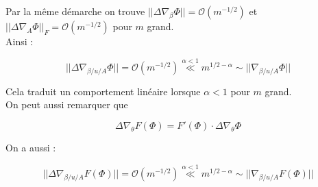 \documentclass[a4paper, 11pt, french]{article}
\begin{document}
\begin{itemize}
	Par la même démarche on trouve $||\Delta \nabla_{\beta} \Phi|| = \mathcal{O}(m^{-1/2})$ et $||\Delta \nabla_{A} \Phi||_F = \mathcal{O}(m^{-1/2})$ pour $m$ grand. \\
	
	Ainsi :
	
	\[||\Delta \nabla_{\beta / u / A} \Phi|| = \mathcal{O}(m^{-1/2}) \stackrel{\alpha < 1}{\ll} m^{1/2 - \alpha} \sim ||\nabla_{\beta / u / A} \Phi||\]
	
	Cela traduit un comportement linéaire lorsque $\alpha < 1$ pour $m$ grand. \\
	
	On peut aussi remarquer que
	
	\[\Delta \nabla_{\theta} F(\Phi) =  F'(\Phi) \cdot \Delta \nabla_{\theta} \Phi \]
	
	On a aussi :

	\[||\Delta \nabla_{\beta / u / A} F(\Phi) || = \mathcal{O}(m^{-1/2}) \stackrel{\alpha < 1}{\ll} m^{1/2 - \alpha} \sim ||\nabla_{\beta / u / A} F(\Phi)||\]

	
		
	\end{itemize}

	
	
\end{document}
